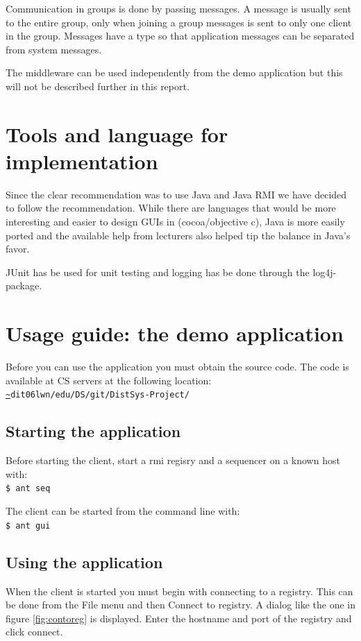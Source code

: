 \documentclass[english]{article}
\begin{document}
Communication in groups is done by passing messages. A message is usually sent to the entire group, only when joining a group messages is sent to only one client in the group. Messages have a type so that application messages can be separated from system messages. 

The middleware can be used independently from the demo application but this will not be described further in this report.


\section{Tools and language for implementation}
Since the clear recommendation was to use Java and Java RMI we have decided to follow the recommendation. While there are languages that would be more interesting and easier to design GUIs in (cocoa/objective c), Java is more easily ported and the available help from lecturers also helped tip the balance in Java's favor.

JUnit has be used for unit testing and logging has be done through the log4j-package. 

\section{Usage guide: the demo application}
Before you can use the application you must obtain the source code. The code is available at CS servers at the following location:
{\tt \url{~}dit06lwn/edu/DS/git/DistSys-Project/}

\subsection{Starting the application}
Before starting the client, start a rmi regisry and a sequencer on a known host with:\\
{\tt \$ ant seq}

The client can be started from the command line with:\\
{\tt \$ ant gui}

\subsection{Using the application}
When the client is started you must begin with connecting to a registry. This can be done from the File menu and then Connect to registry. A dialog like the one in figure \vref{fig:contoreg} is displayed. Enter the hostname and port of the registry and click connect.
\end{document}
